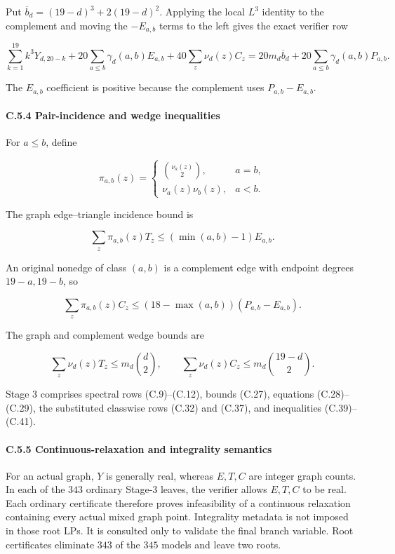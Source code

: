 \documentclass[
  english,
  11pt,
  a4paper,
]{article}
\newcounter{none} %
\begin{document}
Put \(\overline b_d=(19-d)^3+2(19-d)^2\). Applying the local \(L^3\)
identity to the complement and moving the \(-E_{a,b}\) terms to the left
gives the exact verifier row

\[
\sum_{k=1}^{19}k^3Y_{d,20-k}
+20\sum_{a\le b}\gamma_d(a,b)E_{a,b}
+40\sum_z\nu_d(z)C_z
=20m_d\overline b_d
+20\sum_{a\le b}\gamma_d(a,b)P_{a,b}.
\tag{C.37}
\]

The \(E_{a,b}\) coefficient is positive because the complement uses
\(P_{a,b}-E_{a,b}\).

\paragraph{C.5.4 Pair-incidence and wedge
inequalities}\label{c.5.4-pair-incidence-and-wedge-inequalities}

For \(a\le b\), define

\[
\pi_{a,b}(z)=
\begin{cases}
\binom{\nu_a(z)}2,&a=b,\\
\nu_a(z)\nu_b(z),&a<b.
\end{cases}
\tag{C.38}
\]

The graph edge--triangle incidence bound is

\[
\sum_z\pi_{a,b}(z)T_z
\le(\min(a,b)-1)E_{a,b}.
\tag{C.39}
\]

An original nonedge of class \((a,b)\) is a complement edge with
endpoint degrees \(19-a,19-b\), so

\[
\sum_z\pi_{a,b}(z)C_z
\le(18-\max(a,b))(P_{a,b}-E_{a,b}).
\tag{C.40}
\]

The graph and complement wedge bounds are

\[
\sum_z\nu_d(z)T_z\le m_d\binom d2,\qquad
\sum_z\nu_d(z)C_z\le m_d\binom{19-d}{2}.
\tag{C.41}
\]

Stage 3 comprises spectral rows (C.9)--(C.12), bounds (C.27), equations
(C.28)--(C.29), the substituted classwise rows (C.32) and (C.37), and
inequalities (C.39)--(C.41).

\paragraph{C.5.5 Continuous-relaxation and integrality
semantics}\label{c.5.5-continuous-relaxation-and-integrality-semantics}

For an actual graph, \(Y\) is generally real, whereas \(E,T,C\) are
integer graph counts. In each of the \(343\) ordinary Stage-3 leaves,
the verifier allows \(E,T,C\) to be real. Each ordinary certificate
therefore proves infeasibility of a continuous relaxation containing
every actual mixed graph point. Integrality metadata is not imposed in
those root LPs. It is consulted only to validate the final branch
variable. Root certificates eliminate \(343\) of the \(345\) models and
leave two roots.
\end{document}
